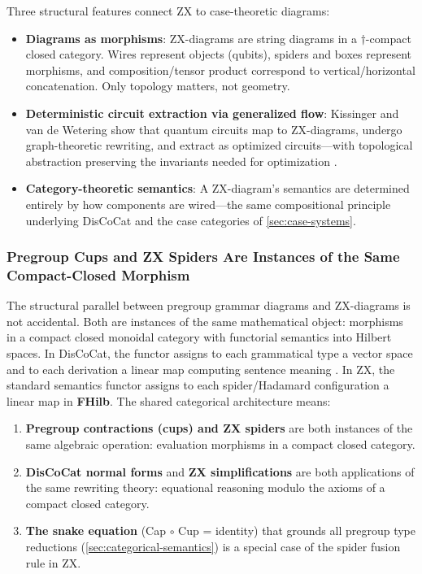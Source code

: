 \documentclass[
]{article}
\providecommand{\tightlist}{%
  \setlength{\itemsep}{0pt}\setlength{\parskip}{0pt}}
\begin{document}
Three structural features connect ZX to case-theoretic diagrams:

\begin{itemize}
\tightlist
\item
  \textbf{Diagrams as morphisms}: ZX-diagrams are string diagrams in a
  \(\dagger\)-compact closed category. Wires represent objects (qubits),
  spiders and boxes represent morphisms, and composition/tensor product
  correspond to vertical/horizontal concatenation. Only topology
  matters, not geometry.
\item
  \textbf{Deterministic circuit extraction via generalized flow}:
  Kissinger and van de Wetering show that quantum circuits map to
  ZX-diagrams, undergo graph-theoretic rewriting, and extract as
  optimized circuits---with topological abstraction preserving the
  invariants needed for optimization \citep{kissinger2020zx}.
\item
  \textbf{Category-theoretic semantics}: A ZX-diagram's semantics are
  determined entirely by how components are wired---the same
  compositional principle underlying DisCoCat and the case categories of
  \autoref{sec:case-systems}.
\end{itemize}

\subsubsection{Pregroup Cups and ZX Spiders Are Instances of the Same
Compact-Closed
Morphism}\label{pregroup-cups-and-zx-spiders-are-instances-of-the-same-compact-closed-morphism}

The structural parallel between pregroup grammar diagrams and
ZX-diagrams is not accidental. Both are instances of the same
mathematical object: morphisms in a compact closed monoidal category
with functorial semantics into Hilbert spaces. In DisCoCat, the functor
assigns to each grammatical type a vector space and to each derivation a
linear map computing sentence meaning \citep{coecke2010mathematical}. In
ZX, the standard semantics functor assigns to each spider/Hadamard
configuration a linear map in \textbf{FHilb}. The shared categorical
architecture means:

\begin{enumerate}
\def\labelenumi{\arabic{enumi}.}
\tightlist
\item
  \textbf{Pregroup contractions (cups) and ZX spiders} are both
  instances of the same algebraic operation: evaluation morphisms in a
  compact closed category.
\item
  \textbf{DisCoCat normal forms} and \textbf{ZX simplifications} are
  both applications of the same rewriting theory: equational reasoning
  modulo the axioms of a compact closed category.
\item
  \textbf{The snake equation} (Cap \(\circ\) Cup = identity) that
  grounds all pregroup type reductions
  (\autoref{sec:categorical-semantics}) is a special case of the spider
  fusion rule in ZX.
\end{enumerate}
\end{document}

